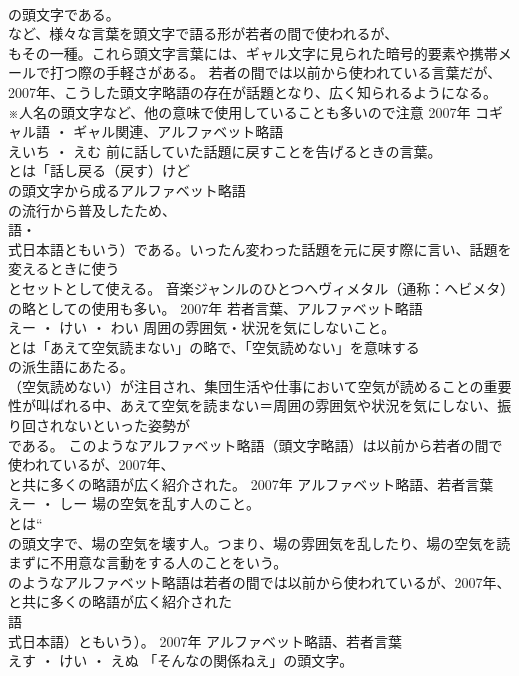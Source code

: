 \documentclass[8pt]{extreport}
\begin{document}
\begin{CJK}{UTF8}{min}
\\	の頭文字である。
\\	など、様々な言葉を頭文字で語る形が若者の間で使われるが、
\\	もその一種。これら頭文字言葉には、ギャル文字に見られた暗号的要素や携帯メールで打つ際の手軽さがある。 若者の間では以前から使われている言葉だが、2007年、こうした頭文字略語の存在が話題となり、広く知られるようになる。 ※人名の頭文字など、他の意味で使用していることも多いので注意	2007年	コギャル語 ・ ギャル関連、アルファベット略語	
\\	えいち ・ えむ	前に話していた話題に戻すことを告げるときの言葉。	
\\	とは「話し戻る（戻す）けど
\\	の頭文字から成るアルファベット略語
\\	の流行から普及したため、
\\	語・
\\	式日本語ともいう）である。いったん変わった話題を元に戻す際に言い、話題を変えるときに使う
\\	とセットとして使える。 音楽ジャンルのひとつヘヴィメタル（通称：ヘビメタ）の略としての使用も多い。	2007年	若者言葉、アルファベット略語	
\\	えー ・ けい ・ わい	周囲の雰囲気・状況を気にしないこと。	
\\	とは「あえて空気読まない」の略で、「空気読めない」を意味する
\\	の派生語にあたる。
\\	（空気読めない）が注目され、集団生活や仕事において空気が読めることの重要性が叫ばれる中、あえて空気を読まない＝周囲の雰囲気や状況を気にしない、振り回されないといった姿勢が
\\	である。 このようなアルファベット略語（頭文字略語）は以前から若者の間で使われているが、2007年、
\\	と共に多くの略語が広く紹介された。	2007年	アルファベット略語、若者言葉	
\\	えー ・ しー	場の空気を乱す人のこと。	
\\	とは“
\\	の頭文字で、場の空気を壊す人。つまり、場の雰囲気を乱したり、場の空気を読まずに不用意な言動をする人のことをいう。 
\\	のようなアルファベット略語は若者の間では以前から使われているが、2007年、
\\	と共に多くの略語が広く紹介された
\\	語
\\	式日本語）ともいう）。	2007年	アルファベット略語、若者言葉	
\\	えす ・ けい ・ えぬ	「そんなの関係ねえ」の頭文字。	

\end{CJK}
\end{document}
